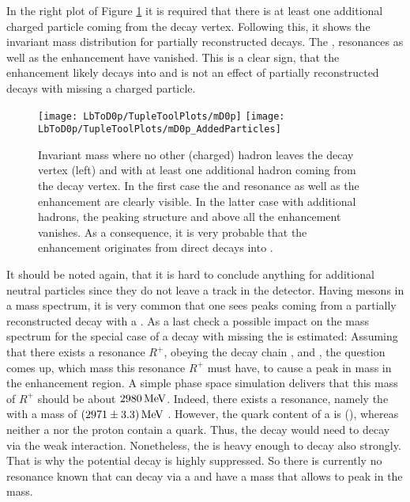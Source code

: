 In the right plot of Figure \ref{fig:mD0p_AdditionalParticles} it is required that there is at least one additional charged particle coming from the \Dz\proton\mun decay vertex.
Following this, it shows the invariant \Dz\proton mass distribution for partially reconstructed decays.
The \LcResI, \LcResII resonances as well as the enhancement have vanished.
This is a clear sign, that the enhancement likely decays into \Dz\proton and is not an effect of partially reconstructed decays with missing a charged particle.
\begin{figure}[tb]
	\centering
	\texttt{[image: LbToD0p/TupleToolPlots/mD0p]}
	\texttt{[image: LbToD0p/TupleToolPlots/mD0p\_AddedParticles]}
	\caption{Invariant \Dz\proton mass where no other (charged) hadron leaves the \Dz\proton\mun decay vertex (left) and with at least one additional hadron coming from the \Dz\proton\mun decay vertex.
             In the first case the \LcResI and \LcResII resonance as well as the enhancement are clearly visible.
             In the latter case with additional hadrons, the peaking structure and above all the enhancement vanishes. 
             As a consequence, it is very probable that the enhancement originates from direct decays into \Dz\proton.
    }
	\label{fig:mD0p_AdditionalParticles}
\end{figure}

It should be noted again, that it is hard to conclude anything for additional neutral particles since they do not leave a track in the detector.
Having \D mesons in a mass spectrum, it is very common that one sees peaks coming from a partially reconstructed decay with a \decay{\Dstar}{\D\pion}.
As a last check a possible impact on the \Dz\proton mass spectrum for the special case of a \decay{\Dstarz}{\Dz\piz} decay with missing the \piz is estimated:
Assuming that there exists a resonance $R^{+}$, obeying the decay chain ,  and \decay{\Dstarz}{\Dz\piz}, the question comes up, which mass this resonance $R^{+}$ must have, to cause a peak in \Dz\proton mass in the enhancement region.
A simple phase space simulation delivers that this mass of $R^{+}$ should be about $2980\mathrm{\,Me\kern -0.1em V}$.
Indeed, there exists a resonance, namely the  with a mass of $(2971 \pm 3.3)\mathrm{\,Me\kern -0.1em V}$ \cite{PDG}.
However, the quark content of a \Xicp is (\uquark\cquark\squark), whereas neither a \Dstarz nor the proton contain a \squark quark.
Thus, the decay  would need to decay via the weak interaction.
Nonetheless, the  is heavy enough to decay also strongly. 
That is why the potential decay  is highly suppressed.
So there is currently no resonance known that can decay via a \Dstarz\proton and have a mass that allows to peak in the \Dz\proton mass.


